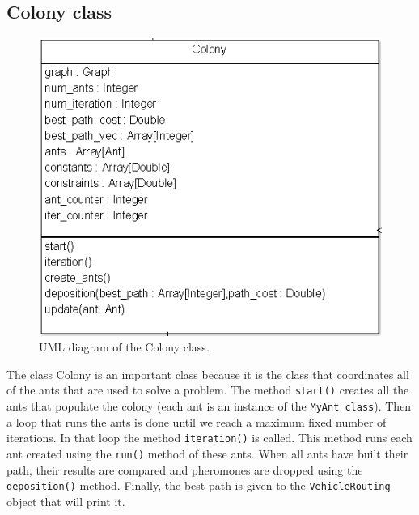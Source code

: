 \subsection{Colony class}
\begin{figure}
	\centering
		\includegraphics[scale = 0.5]{images/colony.png}
	\caption{UML diagram of the Colony class.}
	\label{fig:colony}
\end{figure}
The class Colony is an important class because it is the class that coordinates all of the ants that are used to solve a problem. The method \texttt{start()} creates all the ants that populate the colony (each ant is an instance of the \texttt{MyAnt class}). Then a loop that runs the ants is done until we reach a maximum fixed number of iterations. In that loop the method \texttt{iteration()} is called. This method runs each ant created using the \texttt{run()} method of these ants. When all ants have built their path, their results are compared and pheromones are dropped using the \texttt{deposition()} method. Finally, the best path is given to the \texttt{VehicleRouting} object that will print it.

